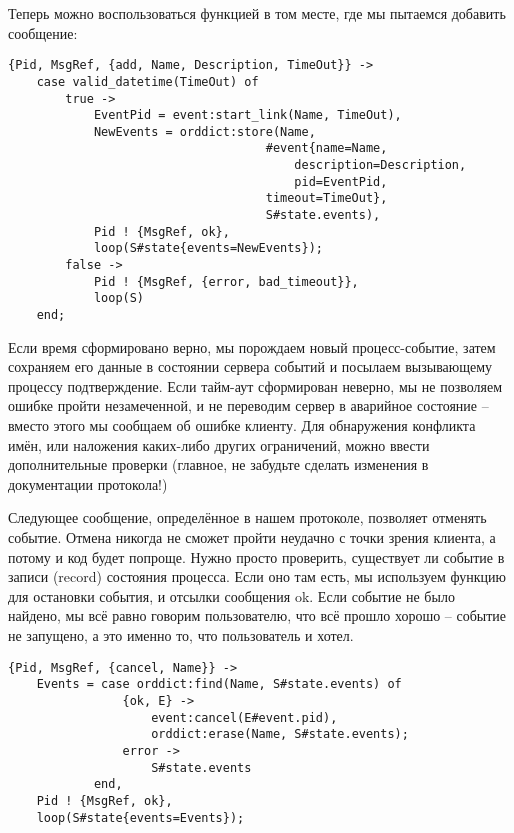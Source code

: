 Теперь можно воспользоваться функцией  в том месте, где мы пытаемся добавить сообщение:
\begin{lstlisting}[style=erlang]
{Pid, MsgRef, {add, Name, Description, TimeOut}} ->
    case valid_datetime(TimeOut) of
        true ->
            EventPid = event:start_link(Name, TimeOut),
            NewEvents = orddict:store(Name,
                                    #event{name=Name,
                                        description=Description,
                                        pid=EventPid,
                                    timeout=TimeOut},
                                    S#state.events),
            Pid ! {MsgRef, ok},
            loop(S#state{events=NewEvents});
        false ->
            Pid ! {MsgRef, {error, bad_timeout}},
            loop(S)
    end;
\end{lstlisting}

Если время сформировано верно, мы порождаем новый процесс\--событие, затем сохраняем его данные в состоянии сервера событий и посылаем вызывающему процессу подтверждение.
Если тайм\--аут сформирован неверно, мы не позволяем ошибке пройти незамеченной, и не переводим сервер в аварийное состояние \--- вместо этого мы сообщаем об ошибке клиенту.
Для обнаружения конфликта имён, или наложения каких\--либо других ограничений, можно ввести дополнительные проверки (главное, не забудьте сделать изменения в документации протокола!)

Следующее сообщение, определённое в нашем протоколе, позволяет отменять событие.
Отмена никогда не сможет пройти неудачно с точки зрения клиента, а потому и код будет попроще.
Нужно просто проверить, существует  ли событие в записи (record) состояния процесса.
Если оно там есть, мы используем функцию  для остановки события, и отсылки сообщения ok.
Если событие не было найдено, мы всё равно говорим пользователю, что всё прошло хорошо \--- событие не запущено, а это именно то, что пользователь и хотел.
\begin{lstlisting}[style=erlang]
{Pid, MsgRef, {cancel, Name}} ->
    Events = case orddict:find(Name, S#state.events) of
                {ok, E} ->
                    event:cancel(E#event.pid),
                    orddict:erase(Name, S#state.events);
                error ->
                    S#state.events
            end,
    Pid ! {MsgRef, ok},
    loop(S#state{events=Events});
\end{lstlisting}

